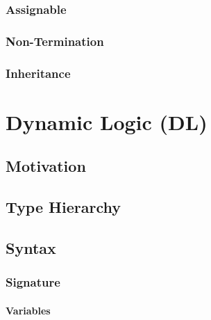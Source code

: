 \documentclass[a4paper, 11pt, accentcolor = tud3b]{tudreport}
\begin{document}
            \subsection{Assignable} %

            \subsection{Non-Termination} %

            \subsection{Inheritance} %

    \chapter{Dynamic Logic (DL)} %

        \section{Motivation} %

        \section{Type Hierarchy} %

        \section{Syntax} %

            \subsection{Signature} %

                \subsubsection{Variables} %
\end{document}
